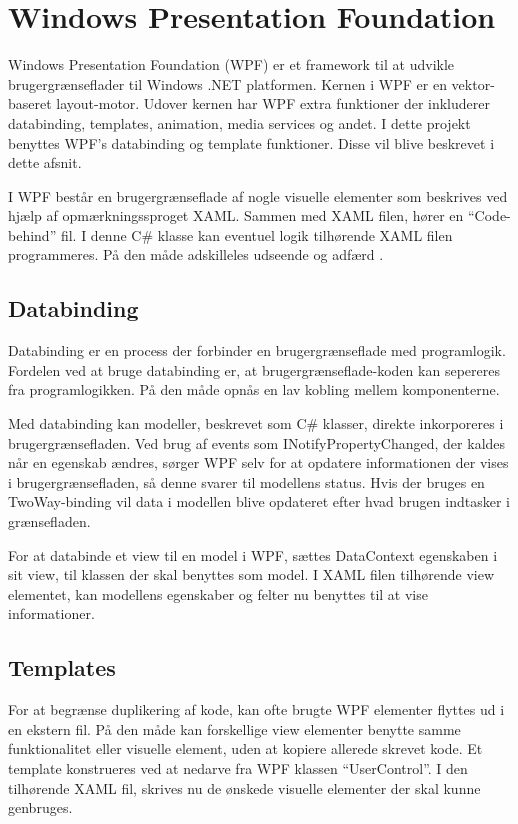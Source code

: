 \section{Windows Presentation Foundation}

Windows Presentation Foundation (WPF) er et framework til at udvikle brugergrænseflader til Windows .NET platformen. Kernen i WPF er en vektor-baseret layout-motor. Udover kernen har WPF extra funktioner der inkluderer databinding, templates, animation, media services og andet. I dette projekt benyttes WPF's databinding og template funktioner. Disse vil blive beskrevet i dette afsnit.

I WPF består en brugergrænseflade af nogle visuelle elementer som beskrives ved hjælp af opmærkningssproget XAML. Sammen med XAML filen, hører en \enquote{Code-behind} fil. I denne C\# klasse kan eventuel logik tilhørende XAML filen programmeres. På den måde adskilleles udseende og adfærd \cite{microsoft_wpf}.

\subsection{Databinding}

Databinding er en process der forbinder en brugergrænseflade med programlogik. Fordelen ved at bruge databinding er, at brugergrænseflade-koden kan sepereres fra programlogikken. På den måde opnås en lav kobling mellem komponenterne.

Med databinding kan modeller, beskrevet som C\# klasser, direkte inkorporeres i brugergrænsefladen. Ved brug af events som INotifyPropertyChanged, der kaldes når en egenskab ændres, sørger WPF selv for at opdatere informationen der vises i brugergrænsefladen, så denne svarer til modellens status. Hvis der bruges en TwoWay-binding vil data i modellen blive opdateret efter hvad brugen indtasker i grænsefladen.
 

For at databinde et view til en model i WPF, sættes DataContext egenskaben i sit view, til klassen der skal benyttes som model. I XAML filen tilhørende view elementet, kan modellens egenskaber og felter nu benyttes til at vise informationer.

\subsection{Templates}

For at begrænse duplikering af kode, kan ofte brugte WPF elementer flyttes ud i en ekstern fil. På den måde kan forskellige view elementer benytte samme funktionalitet eller visuelle element, uden at kopiere allerede skrevet kode. Et template konstrueres ved at nedarve fra WPF klassen \enquote{UserControl}. I den tilhørende XAML fil, skrives nu de ønskede visuelle elementer der skal kunne genbruges.
